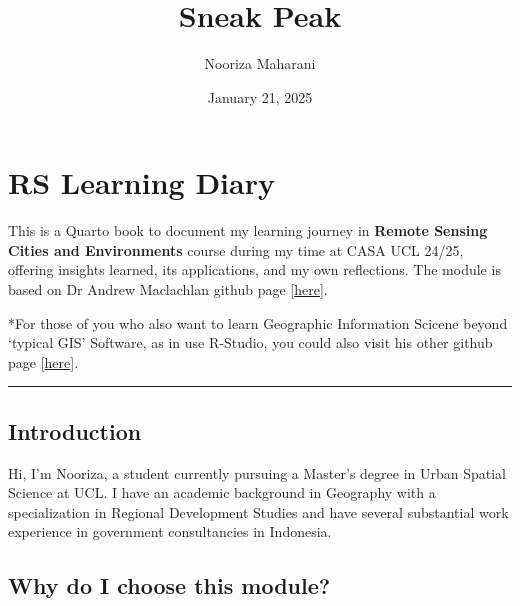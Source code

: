 \documentclass[
  letterpaper,
  DIV=11,
  numbers=noendperiod]{scrreprt}
\title{Sneak Peak}
\author{Nooriza Maharani}
\date{January 21, 2025}
\renewcommand*\contentsname{Table of contents}
\newcommand\contentsname{Table of contents}
\begin{document}
\maketitle
\ifdefined\Shaded\renewenvironment{Shaded}{\begin{tcolorbox}[sharp corners, boxrule=0pt, breakable, enhanced, frame hidden, borderline west={3pt}{0pt}{shadecolor}, interior hidden]}{\end{tcolorbox}}\fi

\renewcommand*\contentsname{Table of contents}
{
\hypersetup{linkcolor=}
\setcounter{tocdepth}{2}
\tableofcontents
}

\hypertarget{rs-learning-diary}{%
\chapter{RS Learning Diary}\label{rs-learning-diary}}

This is a Quarto book to document my learning journey in \textbf{Remote
Sensing Cities and Environments} course during my time at CASA UCL
24/25, offering insights learned, its applications, and my own
reflections. The module is based on Dr Andrew Maclachlan github page
{[}\href{https://andrewmaclachlan.github.io/CASA0023/.}{here}{]}.

*For those of you who also want to learn Geographic Information Scicene
beyond `typical GIS' Software, as in use R-Studio, you could also visit
his other github page
{[}\href{https://andrewmaclachlan.github.io/CASA0005repo/index.html}{here}{]}.

\begin{center}\rule{0.5\linewidth}{0.5pt}\end{center}

\hypertarget{introduction}{%
\section{Introduction}\label{introduction}}

Hi, I'm Nooriza, a student currently pursuing a Master's degree in Urban
Spatial Science at UCL. I have an academic background in Geography with
a specialization in Regional Development Studies and have several
substantial work experience in government consultancies in Indonesia.

\hypertarget{why-do-i-choose-this-module}{%
\section{Why do I choose this
module?}\label{why-do-i-choose-this-module}}
\end{document}
